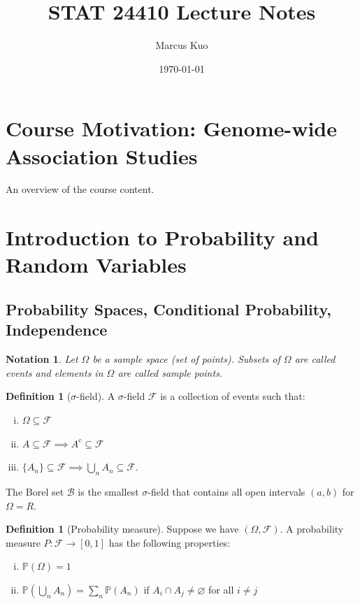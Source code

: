 \documentclass{tufte-handout}
\title{STAT 24410 Lecture Notes}
\author{Marcus Kuo}
\date{\today} %
\renewcommand{\P}{\mathbb{P}}
\let\O\varnothing
\newtheorem{notation}[thm]{Notation}
\theoremstyle{definition}
\newtheorem{defn}[thm]{Definition}
\begin{document}
\maketitle
\tableofcontents

\newpage

\section{Course Motivation: Genome-wide Association Studies}

An overview of the course content.

\section{Introduction to Probability and Random Variables}

\subsection{Probability Spaces, Conditional Probability, Independence}

\begin{notation}
	Let $\Omega$ be a sample space (set of points). Subsets of $\Omega$ are called events and elements in $\Omega$ are called sample points.
\end{notation}
\begin{defn}[$\sigma$-field]
	A $\sigma$-field $\mathscr{F}$ is a collection of events such that:
	\begin{enumerate}[(i)]
		\item $\Omega \subseteq \mathscr{F}$
		\item $A \subseteq \mathscr{F} \implies A^c \subseteq \mathscr{F}$
		\item $\{A_n\} \subseteq \mathscr{F} \implies \bigcup\limits_{n}^{}  A_n \subseteq \mathscr{F}$.
	\end{enumerate}
	The Borel set $\mathscr{B}$ is the smallest $\sigma$-field that contains all open intervals $(a,b)$ for $\Omega = R$.
\end{defn}

\begin{defn}[Probability measure]
	Suppose we have $(\Omega, \mathscr{F}).$ A probability measure $P: \mathscr{F} \to [0,1]$ has the following properties:
	\begin{enumerate}[(i)]
		\item $\P(\Omega) = 1$
		\item $\P\left( \bigcup\limits_{n}^{} A_n \right) = \sum\limits_{n} \P(A_n)$ if $A_i \cap A_j \ne \O$ for all $i \ne j$
	\end{enumerate}
\end{defn}
\end{document}
